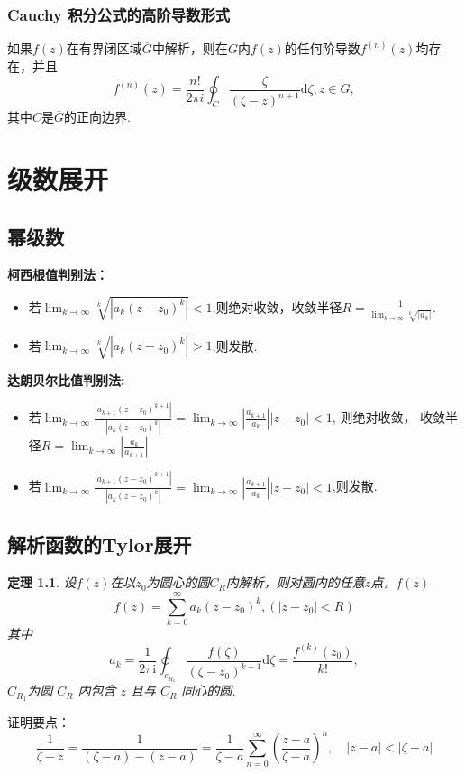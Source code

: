 \documentclass[11pt, a4paper, twoside]{ctexbook}
\newtheorem{theorem}{定理}[section]
\begin{document}
\subsection{Cauchy 积分公式的高阶导数形式}
如果$f(z)$在有界闭区域$\overline{G}$中解析，则在$G$内$f(z)$的任何阶导数$f^{(n)}(z)$均存在，并且
$$f^{(n)}(z)=\frac{n!}{2\pi  i}\oint_C \frac{\zeta}{(\zeta-z)^{n+1}}\mathrm{d}\zeta, z\in G,$$
其中$C$是$\overline{G}$的正向边界.

\renewcommand{\cleardoublepage}{}
\renewcommand{\clearpage}{}
\chapter{级数展开}
\section{幂级数}

\textbf{柯西根值判别法：}
\begin{itemize}
    \item 若$\lim_{k \to \infty}\sqrt[k]{|a_k(z-z_0)^k|} < 1$,则绝对收敛，收敛半径$R = \frac{1}{\lim_{k \to \infty}\sqrt[k]{|a_k|}}$.
    \item 若$\lim_{k \to \infty}\sqrt[k]{|a_k(z-z_0)^k|} > 1$,则发散.
\end{itemize}
\textbf{达朗贝尔比值判别法:}
\begin{itemize}
    \item 若$\lim_{k \to \infty}\frac{|a_{k+1}(z-z_0)^{k+1}|}{|a_k(z-z_0)^k|} = \lim_{k \to \infty}|\frac{a_{k+1}}{a_k}||z-z_0| < 1$, 则绝对收敛，
    收敛半径$R = \lim_{k \to \infty}|\frac{a_k}{a_{k+1}}|$
    \item 若$\lim_{k \to \infty}\frac{|a_{k+1}(z-z_0)^{k+1}|}{|a_k(z-z_0)^k|} = \lim_{k \to \infty}|\frac{a_{k+1}}{a_k}||z-z_0| < 1$,则发散.
\end{itemize}

\section{解析函数的Tylor展开}
\begin{theorem}
    设$f(z)$在以$z_{0}$为圆心的圆$C_R$内解析，则对圆内的任意$z$点，$f(z)$
$$f(z)=\sum_{k=0}^\infty a_k\left(z-z_0\right)^k,(|z-z_0| < R)$$
其中
    $$a_k=\frac1{2\pi\mathrm{i}}\oint_{c_{R_1}}\frac{f(\zeta)}{\left(\zeta-z_0\right)^{k+1}}\mathrm{d}\zeta=\frac{f^{\left(k\right)}\left(z_0\right)}{k!},$$
    $C_{R_1}$为圆 $C_{R}$ 内包含 $z$ 且与 $C_{R}$ 同心的圆.
\end{theorem}
    证明要点：$$\frac{1}{\zeta-z}=\frac{1}{(\zeta-a)-(z-a)}=\frac{1}{\zeta-a}\sum_{n=0}^{\infty}\left(\frac{z-a}{\zeta-a}\right)^{n},\quad|z-a|<|\zeta-a|$$
\end{document}
